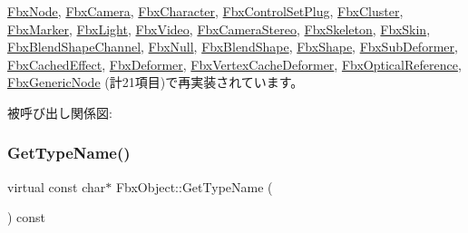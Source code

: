 \hyperlink{class_fbx_node_a0356213c5c7afc57a03002db8b002af7}{Fbx\+Node}, \hyperlink{class_fbx_camera_ac52d0e82cbabac69f8b0dcd212853616}{Fbx\+Camera}, \hyperlink{class_fbx_character_ab0b957ac50d562eb146fff27e0f6b937}{Fbx\+Character}, \hyperlink{class_fbx_control_set_plug_a3111172be32f425f4d9b3bf281d2b4d2}{Fbx\+Control\+Set\+Plug}, \hyperlink{class_fbx_cluster_af989ca14bdf9e025f3db49183dc09811}{Fbx\+Cluster}, \hyperlink{class_fbx_marker_aba200b5397b2fe0397e782ea0a602890}{Fbx\+Marker}, \hyperlink{class_fbx_light_a962256338837265748540bd0b3d9b511}{Fbx\+Light}, \hyperlink{class_fbx_video_a69adf09a2346176545e330cd2c8f23ad}{Fbx\+Video}, \hyperlink{class_fbx_camera_stereo_a73c9df71edcd9a56b2710357b95fcde6}{Fbx\+Camera\+Stereo}, \hyperlink{class_fbx_skeleton_a8407f2dbece8af886d80b5a024626d54}{Fbx\+Skeleton}, \hyperlink{class_fbx_skin_a736228a80b5d0db0075527767286be2d}{Fbx\+Skin}, \hyperlink{class_fbx_blend_shape_channel_a354002154ea342025ba0936e656b640a}{Fbx\+Blend\+Shape\+Channel}, \hyperlink{class_fbx_null_a48d35f4f24364e439f0d8a8e07c6d98f}{Fbx\+Null}, \hyperlink{class_fbx_blend_shape_aa2b22b70c929ac1ad39b12f0ade998d1}{Fbx\+Blend\+Shape}, \hyperlink{class_fbx_shape_a36129584616ab648435077244d6e6dbf}{Fbx\+Shape}, \hyperlink{class_fbx_sub_deformer_a80652fd0521b2ea1897e221e5ae1b5cf}{Fbx\+Sub\+Deformer}, \hyperlink{class_fbx_cached_effect_a0702b43325ac99858e85525b3174e921}{Fbx\+Cached\+Effect}, \hyperlink{class_fbx_deformer_ac3f5a3eb2dda62397fc667004d798319}{Fbx\+Deformer}, \hyperlink{class_fbx_vertex_cache_deformer_a67322e24180497b1f268cad5ed29c08b}{Fbx\+Vertex\+Cache\+Deformer}, \hyperlink{class_fbx_optical_reference_ad45da7e49810bea40ff29fdaf0ca9b0b}{Fbx\+Optical\+Reference}, \hyperlink{class_fbx_generic_node_a348566f1d9605e11b70a36cda95c9afb}{Fbx\+Generic\+Node} (計21項目)で再実装されています。

被呼び出し関係図\+:
\mbox{\label{class_fbx_object_a817dcfa8f7f7e2437324e1e71377c4b2}} 
\subsubsection{\texorpdfstring{Get\+Type\+Name()}{GetTypeName()}}
{\footnotesize\ttfamily virtual const char$\ast$ Fbx\+Object\+::\+Get\+Type\+Name (\begin{DoxyParamCaption}{ }\end{DoxyParamCaption}) const\hspace{0.3cm}{\ttfamily [virtual]}}



